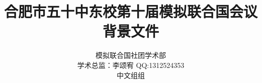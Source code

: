 \documentclass{article}
\title{合肥市五十中东校第十届模拟联合国会议\\\huge 背景文件}
\author{模拟联合国社团学术部 \\ 学术总监：李颂宥 QQ:1312524353 \\ 中文组组}
\begin{document}
    \centering
    \maketitle
    \clearpage
    \tableofcontents
\end{document}
